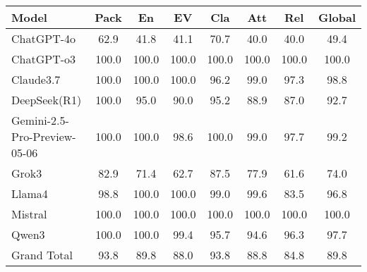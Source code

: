 \begin{tabular}{lS[table-format=3.1]S[table-format=3.1]S[table-format=3.1]S[table-format=3.1]S[table-format=3.1]S[table-format=3.1]S[table-format=3.1]}
\toprule
Model & Pack & En & EV & Cla & Att & Rel & Global \\
\midrule
ChatGPT-4o & 62.9 & 41.8 & 41.1 & 70.7 & 40.0 & 40.0 & 49.4 \\
ChatGPT-o3 & 100.0 & 100.0 & 100.0 & 100.0 & 100.0 & 100.0 & 100.0 \\
Claude3.7 & 100.0 & 100.0 & 100.0 & 96.2 & 99.0 & 97.3 & 98.8 \\
DeepSeek(R1) & 100.0 & 95.0 & 90.0 & 95.2 & 88.9 & 87.0 & 92.7 \\
Gemini-2.5-Pro-Preview-05-06 & 100.0 & 100.0 & 98.6 & 100.0 & 99.0 & 97.7 & 99.2 \\
Grok3 & 82.9 & 71.4 & 62.7 & 87.5 & 77.9 & 61.6 & 74.0 \\
Llama4 & 98.8 & 100.0 & 100.0 & 99.0 & 99.6 & 83.5 & 96.8 \\
Mistral & 100.0 & 100.0 & 100.0 & 100.0 & 100.0 & 100.0 & 100.0 \\
Qwen3 & 100.0 & 100.0 & 99.4 & 95.7 & 94.6 & 96.3 & 97.7 \\
Grand Total & 93.8 & 89.8 & 88.0 & 93.8 & 88.8 & 84.8 & 89.8 \\
\bottomrule
\end{tabular}
